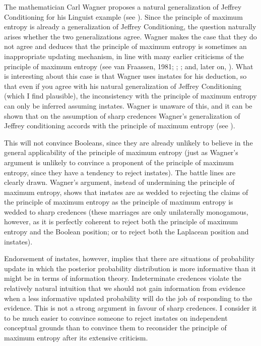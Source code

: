 \documentclass[11pt]{article}
\begin{document}

The mathematician Carl Wagner proposes a natural generalization of
Jeffrey Conditioning for his Linguist example (see
). Since the principle of maximum entropy is
already a generalization of Jeffrey Conditioning, the question
naturally arises whether the two generalizations agree. Wagner makes
the case that they do not agree and deduces that the principle of
maximum entropy is sometimes an inappropriate updating mechanism, in
line with many earlier criticisms of the principle of maximum entropy
(see van Fraassen, 1981;
; ; and, later on,
). What is interesting about this case is
that Wagner uses instates for his deduction, so that even if you agree
with his natural generalization of Jeffrey Conditioning (which I find
plausible), the inconsistency with the principle of maximum entropy
can only be inferred assuming instates. Wagner is unaware of this, and
it can be shown that on the assumption of sharp credences Wagner's
generalization of Jeffrey conditioning accords with the principle of
maximum entropy (see ).

This will not convince Booleans, since they are already unlikely to
believe in the general applicability of the principle of maximum
entropy (just as Wagner's argument is unlikely to convince a proponent
of the principle of maximum entropy, since they have a tendency to
reject instates). The battle lines are clearly drawn. Wagner's
argument, instead of undermining the principle of maximum entropy,
shows that instates are as wedded to rejecting the claims of the
principle of maximum entropy as the principle of maximum entropy is
wedded to sharp credences (these marriages are only unilaterally
monogamous, however, as it is perfectly coherent to reject both the
principle of maximum entropy and the Boolean position; or to reject
both the Laplacean position and instates).

Endorsement of instates, however, implies that there are situations of
probability update in which the posterior probability distribution is
more informative than it might be in terms of information theory.
Indeterminate credences violate the relatively natural intuition that
we should not gain information from evidence when a less informative
updated probability will do the job of responding to the evidence.
This is not a strong argument in favour of sharp credences. I consider
it to be much easier to convince someone to reject instates on
independent conceptual grounds than to convince them to reconsider the
principle of maximum entropy after its extensive criticism.
\end{document}
